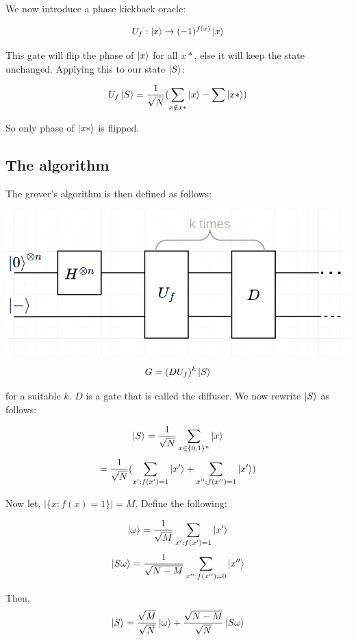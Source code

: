 \documentclass{article}
\begin{document}
            We now introduce a phase kickback oracle: 

            $$U_f: \ket{x} \rightarrow (-1)^{f(x)}\ket{x}$$

            This gate will flip the phase of $\ket{x}$ for all $x*$, else it will keep the state unchanged. Applying this to our state $\ket{S}$: 

            $$U_f\ket{S} = \frac{1}{\sqrt{N}}(\sum_{x \notin x*}\ket{x} - \sum\ket{x*})$$

            So only phase of $\ket{x*}$ is flipped. \\           
            
        \subsection{The algorithm}
            The grover's algorithm is then defined as follows: \\
            
            {
            \centering
            \includegraphics[width=12 cm]{algorithm.png}\par
            }
            
            $$G = (DU_f)^k\ket{S}$$

            for a suitable $k$. $D$ is a gate that is called the diffuser. We now rewrite $\ket{S}$ as follows:

            $$\ket{S} = \frac{1}{\sqrt{N}}\sum_{x \in \{0,1\}^n}\ket{x}$$
            $$=\frac{1}{\sqrt{N}}(\sum_{x': f(x')=1}\ket{x'} + \sum_{x'': f(x'')=1}\ket{x'})$$

            Now let, $|\{x: f(x) = 1\}| = M$. Define the following: 

            $$\ket{\omega} = \frac{1}{\sqrt{M}}\sum_{x': f(x')=1}\ket{x'}$$
            $$\ket{S\omega} = \frac{1}{\sqrt{N-M}}\sum_{x'': f(x'')=0}\ket{x''}$$

            Then,
            $$\ket{S} = \frac{\sqrt{M}}{\sqrt{N}}\ket{\omega} + \frac{\sqrt{N-M}}{\sqrt{N}}\ket{S\omega}$$
\end{document}
